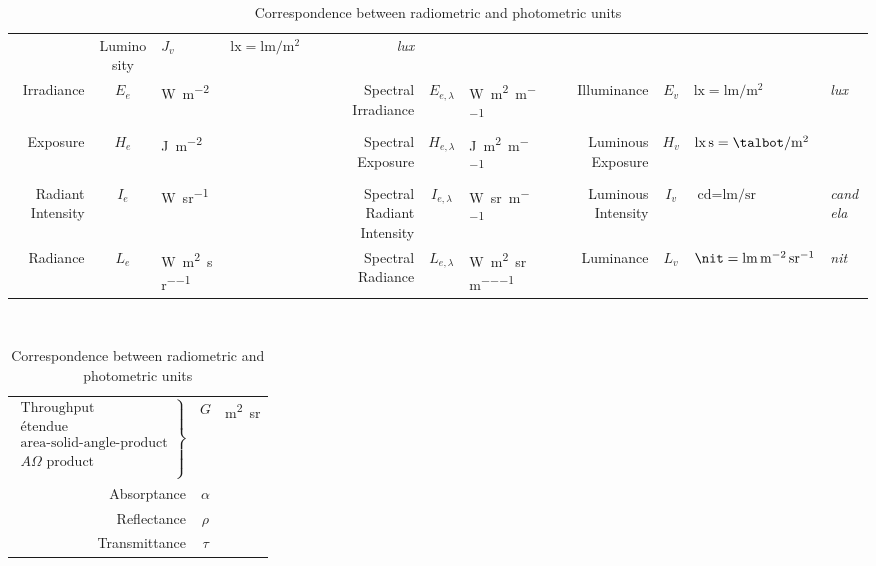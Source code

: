 \begin{table}
{\begin{tabular}{r c l l |@{$\;$} r c l l |@{$\;$} r c l l}
& Luminosity         & $J_v$           & $\unit{\lux} = \unit{\lumen\per\square\meter}$               & \textsl{lux} \\
%
  Irradiance          & $E_{e}$         & \unit{\watt\per\square\meter}                           &                  
& Spectral Irradiance & $E_{e,\lambda}$ & \unit{\watt\per\square\meter\per\meter}                 &                  
& Illuminance         & $E_v$           & $\unit{\lux} = \unit{\lumen\per\square\meter}$          & \textsl{lux}     \\
%
  Exposure          & $H_{e}$         & \unit{\joule\per\square\meter}                           &                  
& Spectral Exposure & $H_{e,\lambda}$ & \unit{\joule\per\square\meter\per\meter}                 &                  
& Luminous Exposure & $H_v$           & $\unit{\lux\second} = \unit{\talbot\per\square\meter}$   &  \\

%
  Radiant Intensity           & $I_{e}$         & \unit{\watt\per\steradian}                            &                  
& Spectral Radiant Intensity  & $I_{e,\lambda}$ & \unit{\watt\per\steradian\per\meter}                  &                  
& Luminous Intensity          & $I_v$           & $\unit{\candela} = \unit{\lumen\per\steradian}$       & \textsl{candela} \\
%
  Radiance           & $L_{e}$         & \unit{\watt\per\square\meter\per\steradian}                  &                  
& Spectral Radiance  & $L_{e,\lambda}$ & \unit{\watt\per\square\meter\per\steradian\per\meter}        &                  
& Luminance          & $L_v$           & $\unit{\nit} = \unit{\lumen\per\square\meter\per\steradian}$ & \textsl{nit}     \\
\end{tabular}\\[4mm]
\begin{tabular}{r @{\quad} c @{\quad} l}
$\left.
\begin{array}{r}
	\text{Throughput} \\ 
	\text{\'etendue} \\
	\text{area-solid-angle-product} \\
	A\Omega\text{ product} \\
\end{array}\right\}$    & $G$ & \unit{\square\meter\steradian} \\
Absorptance            & $\alpha$ & \\
Reflectance            & $\rho$ & \\
Transmittance          & $\tau$ & \\
\end{tabular}
\caption{Correspondence between radiometric and photometric units \label{tab:radiophoto}}

}
\end{table}
